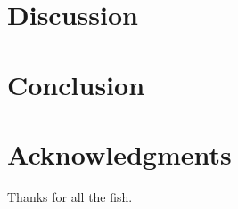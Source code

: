 \documentclass[10pt, conference, compsocconf]{IEEEtran}
\begin{document}
\section{Discussion}








\section{Conclusion}





\section*{Acknowledgments}
Thanks for all the fish.



\end{document}
